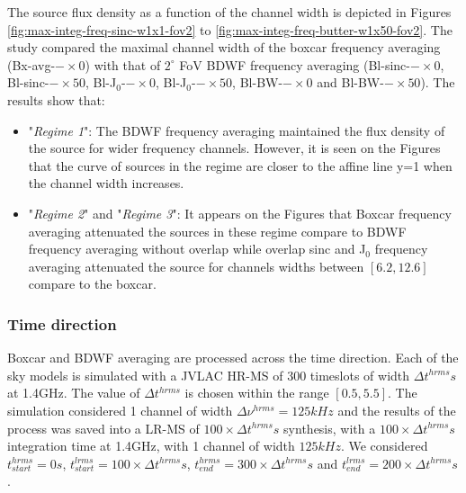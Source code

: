 \documentclass[useAMS,usenatbib]{mn2e}
\begin{document}
The source flux density as a function of the channel width is depicted in Figures \ref{fig:max-integ-freq-sinc-w1x1-fov2} to 
\ref{fig:max-integ-freq-butter-w1x50-fov2}. The study compared the maximal channel width of the boxcar frequency  averaging 
(Bx-avg-$-\times 0$) 
with that of  $2^{\circ}$ FoV BDWF frequency averaging (Bl-sinc-$-\times 0$, Bl-sinc-$-\times 50$, Bl-J$_0$-$-\times 0$, Bl-J$_0$-$-\times 
50$, Bl-BW-$-\times 0$ and Bl-BW-$-\times 50$). 
The results show that:
\begin{itemize}
 \item "\textit{Regime 1}":  The BDWF frequency averaging maintained the flux density of the source for wider frequency channels. However, 
it is seen on the Figures that the curve of sources in the regime are closer to the affine line y=1 when the channel width increases.
 \item  "\textit{Regime 2}" and "\textit{Regime 3}": It appears on the Figures that Boxcar frequency averaging attenuated the sources in 
these regime compare to BDWF frequency averaging without overlap while overlap sinc and J$_0$ frequency averaging attenuated the source for 
channels widths between $[6.2,12.6]$ compare to the boxcar. 
\end{itemize}
\subsubsection{Time direction}
Boxcar and BDWF averaging are processed across the time direction.
 Each of the sky models is simulated with a JVLAC HR-MS of $300$ timeslots of width $\Delta t^{hrms}s$ at 1.4GHz. The value of  
$\Delta t^{hrms}$ is chosen within the range $[0.5,5.5]$. The simulation considered  1 channel of width $\Delta \nu^{hrms}=125kHz$ and the 
results of the process was saved into a LR-MS of $100\times\Delta t^{hrms}s$ synthesis, with a $100\times\Delta t^{hrms}s$ 
integration time at 1.4GHz, with 
1 channel of width $125kHz$. We considered $t^{hrms}_{start}=0s$, $t^{lrms}_{start}=100\times\Delta t^{hrms} s$, 
$t^{hrms}_{end}=300\times\Delta t^{hrms}s$ and $t^{lrms}_{end}=200\times\Delta t^{hrms}s$.
\end{document}
